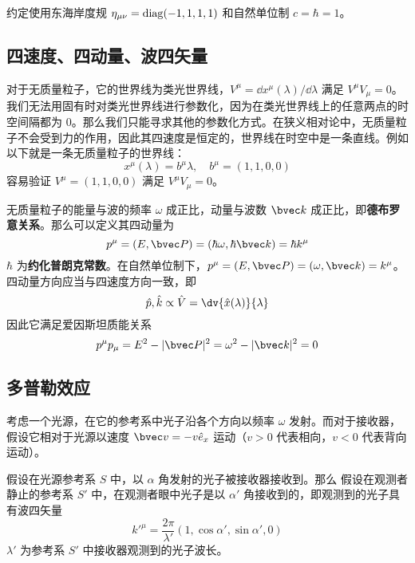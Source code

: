 

约定使用东海岸度规 $\eta_{\mu\nu}=\rm{diag}(-1,1,1,1)$ 和自然单位制 $c=\hbar=1$。
\subsection{四速度、四动量、波四矢量}
对于无质量粒子，它的世界线为类光世界线，$V^\mu=\dd x^\mu(\lambda)/\dd \lambda$ 满足 $V^\mu V_\mu = 0$。我们无法用固有时对类光世界线进行参数化，因为在类光世界线上的任意两点的时空间隔都为 $0$。那么我们只能寻求其他的参数化方式。在狭义相对论中，无质量粒子不会受到力的作用，因此其四速度是恒定的，世界线在时空中是一条直线。例如以下就是一条无质量粒子的世界线：
\begin{equation}
x^\mu(\lambda)=b^\mu \lambda,\quad b^\mu=(1,1,0,0)
\end{equation}
容易验证 $V^\mu=(1,1,0,0)$ 满足 $V^\mu V_\mu = 0$。

无质量粒子的能量与波的频率 $\omega$ 成正比，动量与波数 $\bvec k$ 成正比，即\textbf{德布罗意关系}。那么可以定义其四动量为
\begin{equation}
p^\mu=(E,\bvec P)=(\hbar \omega,\hbar \bvec k)=\hbar k^\mu
\end{equation}
$\hbar$ 为\textbf{约化普朗克常数}。在自然单位制下，$p^\mu=(E,\bvec P)=(\omega,\bvec k)=k^\mu$。四动量方向应当与四速度方向一致，即
\begin{equation}
\hat p,\hat k \propto \hat V=\dv{\hat x(\lambda)}{\lambda}
\end{equation}
因此它满足爱因斯坦质能关系
\begin{equation}
p^\mu p_\mu = E^2-|\bvec P|^2=\omega^2-|\bvec k|^2=0
\end{equation}
\subsection{多普勒效应}
考虑一个光源，在它的参考系中光子沿各个方向以频率 $\omega$ 发射。而对于接收器，假设它相对于光源以速度 $\bvec v=-v \hat e_x$ 运动（$v>0$ 代表相向，$v<0$ 代表背向运动）。

假设在光源参考系 $S$ 中，以 $\alpha$ 角发射的光子被接收器接收到。那么
假设在观测者静止的参考系 $S'$ 中，在观测者眼中光子是以 $\alpha'$ 角接收到的，即观测到的光子具有波四矢量
\begin{equation}
k'^\mu = \frac{2\pi}{\lambda'}(1,\cos\alpha',\sin\alpha',0)
\end{equation}
$\lambda'$ 为参考系 $S'$ 中接收器观测到的光子波长。

